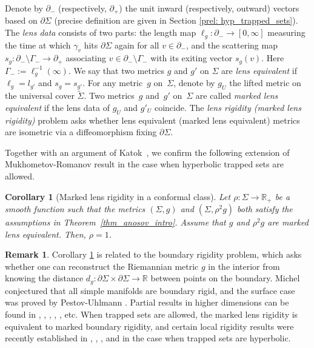\documentclass[10pt]{amsart}
\newcommand{\elg}{\ell_g}
\newtheorem{corintro}[thmintro]{Corollary}
\theoremstyle{definition}
\newtheorem*{remark*}{Remark}
\newcommand{\field}[1]{\mathbb{#1}}
\newcommand{\R}{\field{R}}
\renewcommand{\>}{{\rangle}}
\newcommand{\<}{{\langle}}
\begin{document}
Denote by $\partial_-$ (respectively, $\partial_+$) the unit inward (respectively, outward) vectors based on $\partial \Sigma$ (precise definition are given in Section \ref{prel: hyp_trapped_sets}). The {\it lens data} consists of two parts: the length map $\elg: \partial_-\to [0,\infty]$ measuring the time at which $\gamma_v$ hits $\partial\Sigma$ again for all $v\in\partial_-$, and the scattering map $s_g: \partial_-\setminus\Gamma_-\to \partial_+$ associating $v\in \partial_-\setminus\Gamma_-$ with its exiting vector $s_g(v)$. Here $\Gamma_-:=\elg^{-1}(\infty)$. We say that two metrics $g$ and $g'$ on $\Sigma$ are \textit{lens equivalent} if $\elg=l_{g'}$ and $s_g=s_{g'}$. For any metric~$g$ on~$\Sigma$, denote by $g_U$ the lifted metric on the universal cover $\tilde{\Sigma}$. Two metrics~$g$ and~$g'$ on~$\Sigma$ are called \textit{marked lens equivalent} if the lens data of $g_U$ and $g'_U$ coincide. The \textit{lens rigidity (\resp marked lens rigidity)} problem asks whether lens equivalent (\resp marked lens equivalent) metrics are isometric via a diffeomorphism fixing $\partial \Sigma$.

Together with an argument of Katok~\cite{K88}, we confirm the following extension of Mukhometov-Romanov result \cite{MR78} in the case when hyperbolic trapped sets are allowed.
\begin{corintro}[Marked lens rigidity in a conformal class]
\label{cor_conf_class}
Let $\rho\colon \Sigma\to\R_+$ be a smooth function such that the metrics $(\Sigma, g)$ and $(\Sigma, \rho^2 g)$ both satisfy the assumptions in Theorem~\ref{thm_anosov_intro}. Assume that $g$ and $\rho^2 g$ are marked lens equivalent. Then, $\rho=1$.
\end{corintro}

\begin{remark*}
Corollary \ref{cor_conf_class} is related to the boundary rigidity problem, which asks whether one can reconstruct the Riemannian metric $g$ in the interior from knowing the distance $d_g: \partial \Sigma\times \partial \Sigma\to\mathbb{R}$ between points on the boundary. Michel \cite{M81} conjectured that all simple manifolds are boundary rigid, and the surface case was proved by Pestov-Uhlmann \cite{PU05}. Partial results in higher dimensions can be found in \cite{SU09}, \cite{V09}, \cite{BI10}, \cite{BI13}, \cite{SUV17}, etc. When trapped sets are allowed, the marked lens rigidity is equivalent to marked boundary rigidity, and certain local rigidity results were recently established in \cite{G17}, \cite{GM18}, \cite{L19}, and \cite{L20} in the case when trapped sets are hyperbolic.
\end{remark*}
\end{document}
